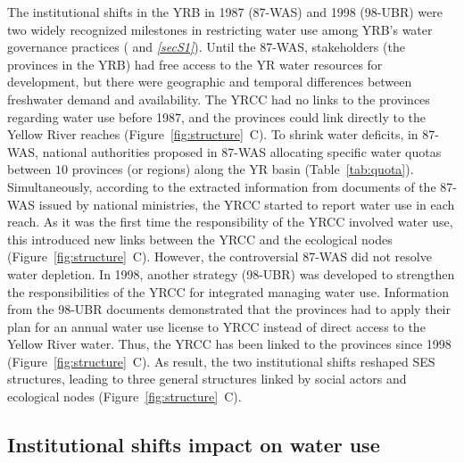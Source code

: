 \documentclass[default, sn-standardnature]{sn-jnl}
\begin{document}
The institutional shifts in the YRB in 1987 (87-WAS) and 1998 (98-UBR) were two widely recognized milestones in restricting water use among YRB's water governance practices (\textit{} and \textit{\ref{secS1}}).
Until the 87-WAS, stakeholders (the provinces in the YRB) had free access to the YR water resources for development, but there were geographic and temporal differences between freshwater demand and availability.
The YRCC had no links to the provinces regarding water use before 1987, and the provinces could link directly to the Yellow River reaches (Figure~\ref{fig:structure}~C).
To shrink water deficits, in 87-WAS, national authorities proposed in 87-WAS allocating specific water quotas between $10$ provinces (or regions) along the YR basin (Table~\ref{tab:quota}).
Simultaneously, according to the extracted information from documents of the 87-WAS issued by national ministries, the YRCC started to report water use in each reach.
As it was the first time the responsibility of the YRCC involved water use, this introduced new links between the YRCC and the ecological nodes (Figure~\ref{fig:structure}~C).
However, the controversial 87-WAS did not resolve water depletion.
In 1998, another strategy (98-UBR) was developed to strengthen the responsibilities of the YRCC for integrated managing water use.
Information from the 98-UBR documents demonstrated that the provinces had to apply their plan for an annual water use license to YRCC instead of direct access to the Yellow River water.
Thus, the YRCC has been linked to the provinces since 1998 (Figure~\ref{fig:structure}~C).
As result, the two institutional shifts reshaped SES structures, leading to three general structures linked by social actors and ecological nodes (Figure~\ref{fig:structure}~C).


\subsection{Institutional shifts impact on water use}
\label{result-2}
\end{document}

